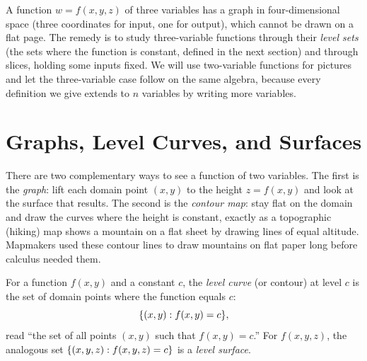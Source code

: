 A function $w=f(x,y,z)$ of three variables has a graph in four-dimensional space (three
coordinates for input, one for output), which cannot be drawn on a flat page. The remedy is to study
three-variable functions through their \emph{level sets} (the sets where the function is
constant, defined in the next section) and through slices, holding
some inputs fixed. We will use two-variable functions for pictures and let the
three-variable case follow on the same algebra, because every definition we give extends
to $n$ variables by writing more variables.

\section{Graphs, Level Curves, and Surfaces}
\label{ch32:sec-graphs}

There are two complementary ways to see a function of two variables. The first is the
\emph{graph}: lift each domain point $(x,y)$ to the height $z=f(x,y)$ and look at the surface
that results. The second is the \emph{contour map}: stay flat on the domain and draw the
curves where the height is constant, exactly as a topographic (hiking) map shows a mountain on
a flat sheet by drawing lines of equal altitude. Mapmakers used these contour lines to draw
mountains on flat paper long before calculus needed them.

\begin{definition}
\label{ch32:def-level}
For a function $f(x,y)$ and a constant $c$, the \emph{level curve} (or contour) at level $c$
is the set of domain points where the function equals $c$:
\[
   \{ (x,y) : f(x,y) = c \},
\]
read ``the set of all points $(x,y)$ such that $f(x,y)=c$.''
For $f(x,y,z)$, the analogous set $\{(x,y,z): f(x,y,z)=c\}$ is a \emph{level surface}.
\end{definition}

